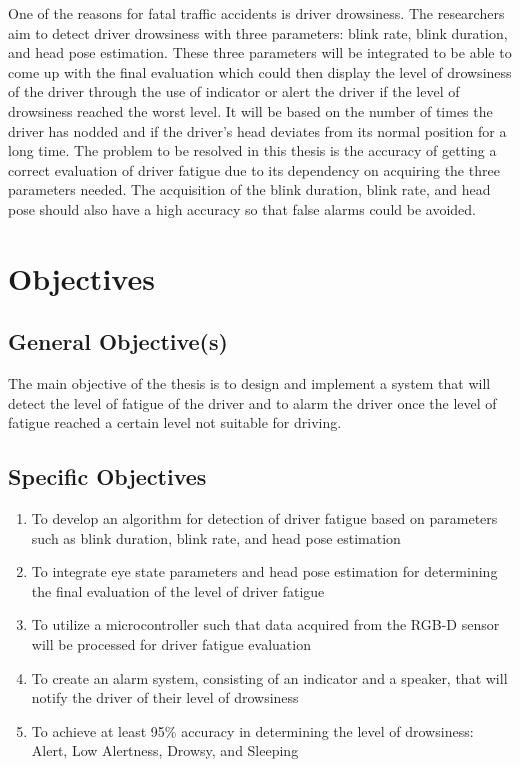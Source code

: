 One of the reasons for fatal traffic accidents is driver drowsiness. The researchers aim to detect driver drowsiness with three parameters: blink rate, blink duration, and head pose estimation. These three parameters will be integrated to be able to come up with the final evaluation which could then display the level of drowsiness of the driver through the use of indicator or alert the driver if the level of drowsiness reached the worst level. It will be based on the number of times the driver has nodded and if the driver’s head deviates from its normal position for a long time. The problem to be resolved in this thesis is the accuracy of getting a correct evaluation of driver fatigue due to its dependency on acquiring the three parameters needed. The acquisition of the blink duration, blink rate, and head pose should also have a high accuracy so that false alarms could be avoided. 



\section{Objectives}


\subsection{General Objective(s)}
The main objective of the thesis is to design and implement a system that will detect the level of fatigue of the driver and to alarm the driver once the level of fatigue reached a certain level not suitable for driving.

\subsection{Specific Objectives}

\begin{enumerate}
	
	\item To develop an algorithm for detection of driver fatigue based on parameters such as blink duration, blink rate, and head pose estimation
	
	\item To integrate eye state parameters and head pose estimation for determining the final evaluation of the level of driver fatigue
	
	\item To utilize a microcontroller such that data acquired from the RGB-D sensor will be processed for driver fatigue evaluation
	
	\item To create an alarm system, consisting of an indicator and a speaker, that will notify the driver of their level of drowsiness
	
	\item To achieve at least 95\% accuracy in determining the level of drowsiness: Alert, Low Alertness, Drowsy, and Sleeping
	
	
\end{enumerate}



